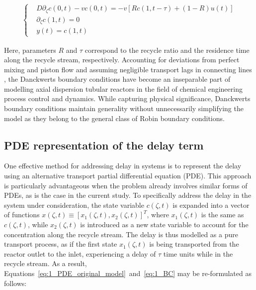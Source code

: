 \begin{align} \label{eq:1_BC}
    \begin{cases}
        &D \partial_\zeta c(0, t) - v c(0, t) = -v \left[ R c(1, t-\tau) + (1-R) u(t) \right] \\
        &\partial_\zeta c(1, t) = 0 \\
        &y(t) = c(1, t)
    \end{cases}
\end{align}

Here, parameters $R$ and $\tau$ correspond to the recycle ratio and the residence time along the recycle stream, respectively. Accounting for deviations from perfect mixing and piston flow and assuming negligible transport lags in connecting lines \autocite{Danckwerts1953Continuous}, the Danckwerts boundary conditions have become an inseparable part of modelling axial dispersion tubular reactors in the field of chemical engineering process control and dynamics. While capturing physical significance, Danckwerts boundary conditions maintain generality without unnecessarily simplifying the model as they belong to the general class of Robin boundary conditions.


\subsection{PDE representation of the delay term}

One effective method for addressing delay in systems is to represent the delay using an alternative transport partial differential equation (PDE). This approach is particularly advantageous when the problem already involves similar forms of PDEs, as is the case in the current study. To specifically address the delay in the system under consideration, the state variable $c(\zeta, t)$ is expanded into a vector of functions ${x}(\zeta, t) \equiv [x_1(\zeta, t), x_2(\zeta, t)]^T$, where $x_1(\zeta, t)$ is the same as $c(\zeta, t)$, while $x_2(\zeta, t)$ is introduced as a new state variable to account for the concentration along the recycle stream. The delay is thus modelled as a pure transport process, as if the first state $x_1(\zeta, t)$ is being transported from the reactor outlet to the inlet, experiencing a delay of $\tau$ time units while in the recycle stream. As a result, Equations~\ref{eq:1_PDE_original_model}~and~\ref{eq:1_BC} may be re-formulated as follows:


